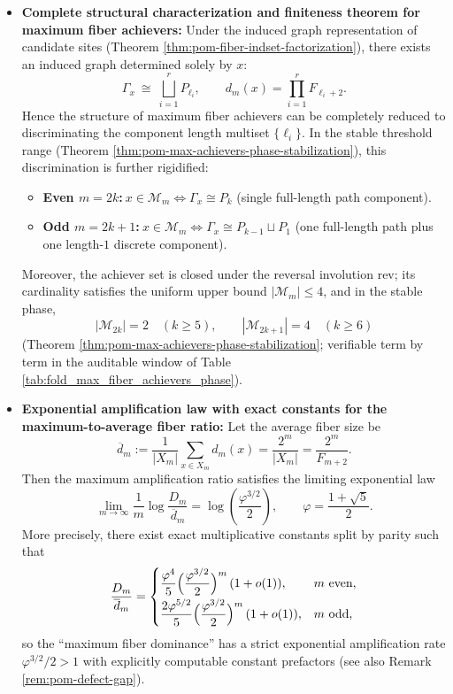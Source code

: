 \begin{enumerate}
\begin{itemize}
    \item \textbf{Complete structural characterization and finiteness theorem for maximum fiber achievers:}
    Under the induced graph representation of candidate sites (Theorem \ref{thm:pom-fiber-indset-factorization}), there exists an induced graph determined solely by \(x\):
    \[
    \Gamma_x\ \cong\ \bigsqcup_{i=1}^r P_{\ell_i},
    \qquad
    d_m(x)=\prod_{i=1}^r F_{\ell_i+2}.
    \]
    Hence the structure of maximum fiber achievers can be completely reduced to discriminating the component length multiset \(\{\ell_i\}\).
    In the stable threshold range (Theorem \ref{thm:pom-max-achievers-phase-stabilization}), this discrimination is further rigidified:
    \begin{itemize}
      \item \textbf{Even \(m=2k\):}\(\ x\in\mathcal{M}_m\iff \Gamma_x\cong P_k\) (single full-length path component).
      \item \textbf{Odd \(m=2k+1\):}\(\ x\in\mathcal{M}_m\iff \Gamma_x\cong P_{k-1}\sqcup P_1\) (one full-length path plus one length-\(1\) discrete component).
    \end{itemize}
    Moreover, the achiever set is closed under the reversal involution \(\mathrm{rev}\); its cardinality satisfies the uniform upper bound \(|\mathcal{M}_m|\le 4\), and in the stable phase,
    \[
    |\mathcal{M}_{2k}|=2\quad(k\ge 5),
    \qquad
    |\mathcal{M}_{2k+1}|=4\quad(k\ge 6)
    \]
    (Theorem \ref{thm:pom-max-achievers-phase-stabilization}; verifiable term by term in the auditable window of Table \ref{tab:fold_max_fiber_achievers_phase}).

    \item \textbf{Exponential amplification law with exact constants for the maximum-to-average fiber ratio:}
    Let the average fiber size be
    \[
    \overline d_m:=\frac{1}{|X_m|}\sum_{x\in X_m}d_m(x)=\frac{2^m}{|X_m|}=\frac{2^m}{F_{m+2}}.
    \]
    Then the maximum amplification ratio satisfies the limiting exponential law
    \[
    \lim_{m\to\infty}\frac{1}{m}\log\frac{D_m}{\overline d_m}
    =\log\!\left(\frac{\varphi^{3/2}}{2}\right),
    \qquad \varphi=\frac{1+\sqrt5}{2}.
    \]
    More precisely, there exist exact multiplicative constants split by parity such that
    \[
    \frac{D_m}{\overline d_m}
    =
    \begin{cases}
    \displaystyle \frac{\varphi^{4}}{5}\Bigl(\frac{\varphi^{3/2}}{2}\Bigr)^{m}\,(1+o(1)),& m\ \text{even},\\[1.2ex]
    \displaystyle \frac{2\varphi^{5/2}}{5}\Bigl(\frac{\varphi^{3/2}}{2}\Bigr)^{m}\,(1+o(1)),& m\ \text{odd},
    \end{cases}
    \]
    so the ``maximum fiber dominance'' has a strict exponential amplification rate \(\varphi^{3/2}/2>1\) with explicitly computable constant prefactors (see also Remark \ref{rem:pom-defect-gap}).


\end{itemize}
\end{enumerate}
